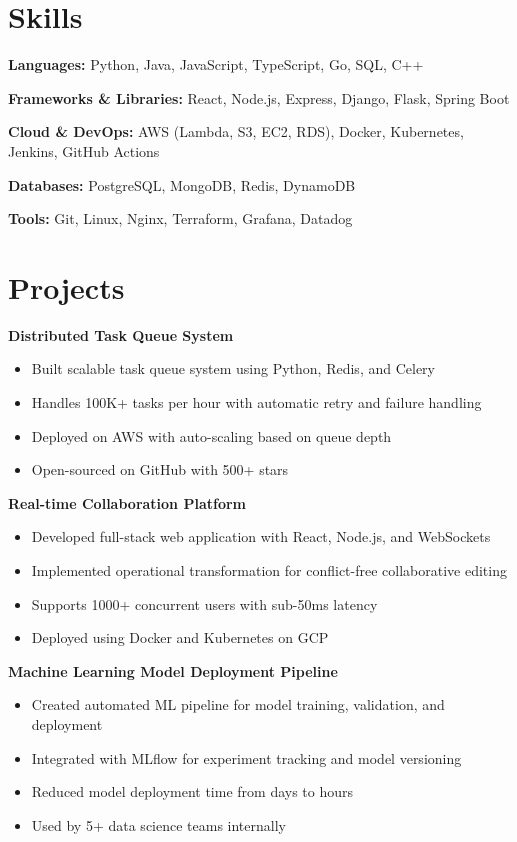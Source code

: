 \documentclass{article}
\begin{document}
\section{Skills}

\textbf{Languages:} Python, Java, JavaScript, TypeScript, Go, SQL, C++

\textbf{Frameworks \& Libraries:} React, Node.js, Express, Django, Flask, Spring Boot

\textbf{Cloud \& DevOps:} AWS (Lambda, S3, EC2, RDS), Docker, Kubernetes, Jenkins, GitHub Actions

\textbf{Databases:} PostgreSQL, MongoDB, Redis, DynamoDB

\textbf{Tools:} Git, Linux, Nginx, Terraform, Grafana, Datadog

\section{Projects}

\textbf{Distributed Task Queue System}
\begin{itemize}
\item Built scalable task queue system using Python, Redis, and Celery
\item Handles 100K+ tasks per hour with automatic retry and failure handling
\item Deployed on AWS with auto-scaling based on queue depth
\item Open-sourced on GitHub with 500+ stars
\end{itemize}

\textbf{Real-time Collaboration Platform}
\begin{itemize}
\item Developed full-stack web application with React, Node.js, and WebSockets
\item Implemented operational transformation for conflict-free collaborative editing
\item Supports 1000+ concurrent users with sub-50ms latency
\item Deployed using Docker and Kubernetes on GCP
\end{itemize}

\textbf{Machine Learning Model Deployment Pipeline}
\begin{itemize}
\item Created automated ML pipeline for model training, validation, and deployment
\item Integrated with MLflow for experiment tracking and model versioning
\item Reduced model deployment time from days to hours
\item Used by 5+ data science teams internally
\end{itemize}
\end{document}
